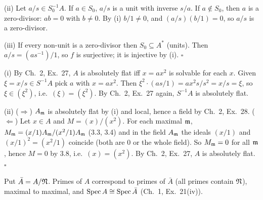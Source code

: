 \documentclass[11pt]{article}
\begin{document}
(ii) Let $a/s\in S_0^{-1}A$. If $a\in S_0$, $a/s$ is a unit with inverse $s/a$. If $a\notin S_0$, then $a$ is a zero-divisor: $ab=0$ with $b\ne0$. By (i) $b/1\ne0$, and $(a/s)(b/1)=0$, so $a/s$ is a zero-divisor.

(iii) If every non-unit is a zero-divisor then $S_0\subseteq A^*$ (units). Then $a/s=(as^{-1})/1$, so $f$ is surjective; it is injective by (i). \hfill$\square$

\pf
(i) By Ch.~2, Ex.~27, $A$ is absolutely flat iff $x=ax^2$ is solvable for each $x$. Given $\xi=x/s\in S^{-1}A$ pick $a$ with $x=ax^2$. Then $\xi^2\cdot(as/1)=ax^2s/s^2=x/s=\xi$, so $\xi\in(\xi^2)$, i.e.\ $(\xi)=(\xi^2)$. By Ch.~2, Ex.~27 again, $S^{-1}A$ is absolutely flat.

(ii) ($\Rightarrow$) $A_\mathfrak m$ is absolutely flat by (i) and local, hence a field by Ch.~2, Ex.~28.
($\Leftarrow$) Let $x\in A$ and $M=(x)/(x^2)$. For each maximal $\mathfrak m$, $M_\mathfrak m=(x/1)A_\mathfrak m/(x^2/1)A_\mathfrak m$ (3.3, 3.4) and in the field $A_\mathfrak m$ the ideals $(x/1)$ and $(x/1)^2=(x^2/1)$ coincide (both are $0$ or the whole field). So $M_\mathfrak m=0$ for all $\mathfrak m$, hence $M=0$ by 3.8, i.e.\ $(x)=(x^2)$. By Ch.~2, Ex.~27, $A$ is absolutely flat. \hfill$\square$

\pf
Put $\bar A=A/\mathfrak N$. Primes of $A$ correspond to primes of $\bar A$ (all primes contain $\mathfrak N$), maximal to maximal, and $\operatorname{Spec} A\cong\operatorname{Spec}\bar A$ (Ch.~1, Ex.~21(iv)).
\end{document}
